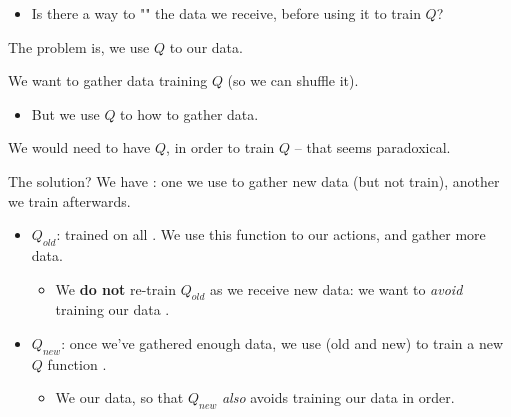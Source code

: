         \begin{itemize}
            \item Is there a way to "" the data we receive, before using it to train $Q$?
        \end{itemize}

        The problem is, we use $Q$ to  our data.\\

        \begin{concept}
            We want to gather data  training $Q$ (so we can shuffle it).

            \begin{itemize}
                \item But we use $Q$ to  how to gather data.
            \end{itemize}

            We would need to have $Q$, in order to train $Q$ -- that seems paradoxical.
        \end{concept}

        The solution? We have : one we use to gather new data (but not train), another we train afterwards.

        \begin{itemize}
            \item $Q_{old}$: trained on all . We use this function to  our actions, and gather more data.

                \begin{itemize}
                    \item We \textbf{do not} re-train $Q_{old}$ as we receive new data: we want to \textit{avoid} training our data .
                \end{itemize}

            \item $Q_{new}$: once we've gathered enough data, we use  (old and new) to train a new $Q$ function .

                \begin{itemize}
                    \item We  our data, so that $Q_{new}$ \textit{also} avoids training our data in order.
                \end{itemize}
                
        \end{itemize}

